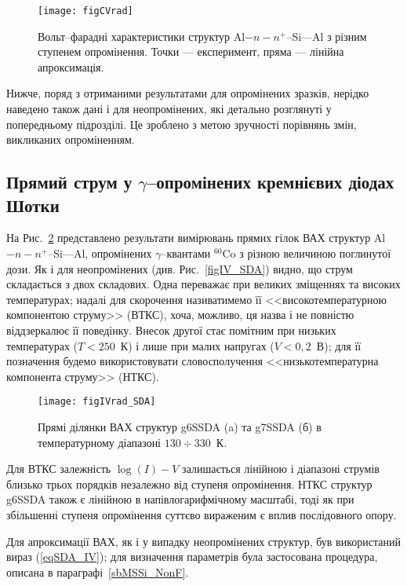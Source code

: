 \begin{figure}
\center
\texttt{[image: figCVrad]}
\caption{\label{figCVrad}
Вольт--фарадні характеристики структур Al$-n-n^+$--Si---Al з різним ступенем опромінення.
Точки --- експеримент, пряма --- лінійна апроксимація.
}%
\end{figure}


Нижче, поряд з отриманими результатами для опромінених зразків, нерідко наведено також дані і для неопромінених,
які детально розглянуті у попередньому підрозділі.
Це зроблено з метою зручності порівнянь змін, викликаних опроміненням.


\subsection{Прямий струм у $\gamma$--опромінених кремнієвих діодах Шотки}

На Рис.~\ref{figIVrad_SDA} представлено результати вимірювань прямих гілок ВАХ структур Al$-n-n^+$--Si---Al, опромінених
$\gamma$--квантами $^{60}$Co з різною величиною поглинутої дози.
Як і для неопромінених (див. Рис.~\ref{figIV_SDA}) видно, що струм складається з двох складових.
Одна переважає при великих зміщеннях та високих температурах; надалі для скорочення називатимемо її
<<високотемпературною компонентою струму>> (ВТКС), хоча, можливо, ця назва і не повністю віддзеркалює її поведінку.
Внесок другої стає помітним при низьких температурах ($T<250$~К) і лише при малих напругах ($V<0,2$~В);
для її позначення будемо використовувати словосполучення <<низькотемпературна компонента струму>> (НТКС).


\begin{figure}
\center
\texttt{[image: figIVrad\_SDA]}
\caption{\label{figIVrad_SDA}
Прямі  ділянки ВАХ структур g6SSDA (a)  та g7SSDA (б) в температурному діапазоні $130\div330$~К.
}%
\end{figure}

Для ВТКС залежність $\log(I)-V$ залишається лінійною і діапазоні струмів близько трьох порядків незалежно від ступеня опромінення.
НТКС структур g6SSDA також є лінійною в напівлогарифмічному масштабі, тоді як при
збільшенні ступеня опромінення суттєво вираженим є вплив послідовного опору.

Для апроксимації ВАХ, як і у випадку неопромінених структур, був використаний вираз (\ref{eqSDA_IV});
для визначення параметрів була застосована процедура, описана в параграфі~\ref{sbMSSi_NonF}.


